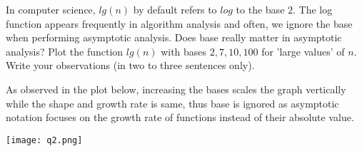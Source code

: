 \documentclass[addpoints,11pt,a4paper]{exam}
\begin{document}
\begin{questions}
\begin{solution}
\end{solution}

\question[1] In computer science, $lg (n)$ by default refers to $log$ to the base $2$. The log function appears frequently in algorithm analysis and often, we ignore the base when performing asymptotic analysis. Does base really matter in asymptotic analysis? Plot the function $lg (n)$ with bases $2, 7, 10, 100$ for 'large values' of $n$. Write your observations (in two to three sentences only).

\begin{solution}
    As observed in the plot below, increasing the bases scales the graph vertically while the shape and growth rate is same, thus base is ignored as asymptotic notation focuses on the growth rate of functions instead of their absolute value.
    
    \texttt{[image: q2.png]} %
    
\end{solution}

\end{questions}
\end{document}
